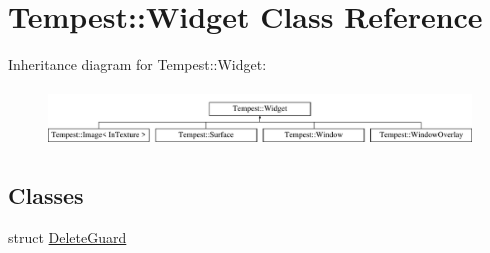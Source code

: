 \hypertarget{class_tempest_1_1_widget}{\section{Tempest\+:\+:Widget Class Reference}
\label{class_tempest_1_1_widget}
}
Inheritance diagram for Tempest\+:\+:Widget\+:\begin{figure}[H]
\begin{center}
\leavevmode
\includegraphics[height=1.546961cm]{class_tempest_1_1_widget}
\end{center}
\end{figure}
\subsection*{Classes}
\begin{DoxyCompactItemize}
\item 
struct \hyperlink{struct_widget_1_1_delete_guard}{Delete\+Guard}
\end{DoxyCompactItemize}

